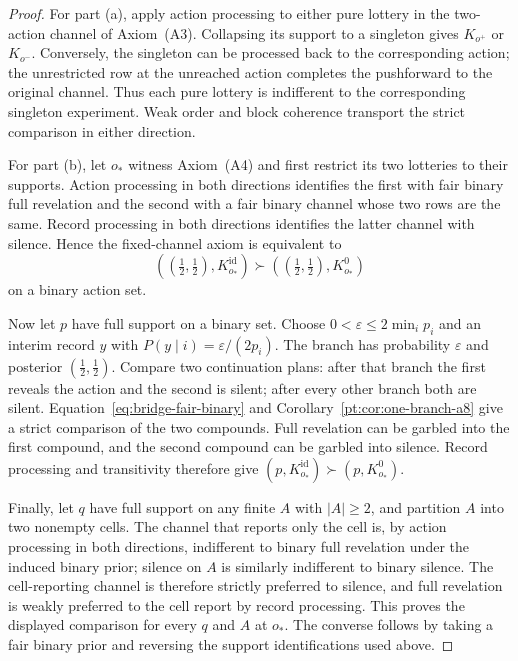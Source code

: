\begin{proof}
For part \textup{(a)}, apply action processing to either pure lottery in the
two-action channel of Axiom~\textup{(A3)}.  Collapsing its support to
a singleton gives $K_{o^+}$ or $K_{o^-}$.  Conversely, the singleton can be
processed back to the corresponding action; the unrestricted row at the
unreached action completes the pushforward to the original channel.  Thus
each pure lottery is indifferent to the corresponding singleton experiment.
Weak order and block coherence transport the strict comparison in either
direction.

For part \textup{(b)}, let $o_\ast$ witness Axiom~\textup{(A4)} and first
restrict its two lotteries to their supports.  Action processing in both
directions identifies the first with fair binary full revelation and the
second with a fair binary channel whose two rows are the same.  Record
processing in both directions identifies the latter channel with silence.
Hence the fixed-channel axiom is equivalent to
\begin{equation}
  ((\tfrac12,\tfrac12),K^{\mathrm{id}}_{o_\ast})
  \succ
  ((\tfrac12,\tfrac12),K^0_{o_\ast})
  \label{eq:bridge-fair-binary}
\end{equation}
on a binary action set.

Now let $p$ have full support on a binary set.  Choose
$0<\varepsilon\le 2\min_i p_i$ and an interim record $y$ with
$P(y\mid i)=\varepsilon/(2p_i)$.  The branch has probability $\varepsilon$
and posterior $(\tfrac12,\tfrac12)$.  Compare two continuation plans: after that branch the
first reveals the action and the second is silent; after every other branch
both are silent.  Equation~\eqref{eq:bridge-fair-binary} and
Corollary~\ref{pt:cor:one-branch-a8} give a strict comparison of the two compounds.  Full revelation
can be garbled into the first compound, and the second compound can be
garbled into silence.  Record processing and transitivity therefore give
$(p,K^{\mathrm{id}}_{o_\ast})\succ(p,K^0_{o_\ast})$.

Finally, let $q$ have full support on any finite $A$ with $|A|\ge2$, and
partition $A$ into two nonempty cells.  The channel that reports only the cell
is, by action processing in both directions, indifferent to binary full
revelation under the induced binary prior; silence on $A$ is similarly
indifferent to binary silence.  The cell-reporting channel is therefore
strictly preferred to silence, and full revelation is weakly preferred to
the cell report by record processing.  This proves the displayed
comparison for every $q$ and $A$ at $o_\ast$.  The converse follows by taking
a fair binary prior and reversing the support identifications used above.
\end{proof}

